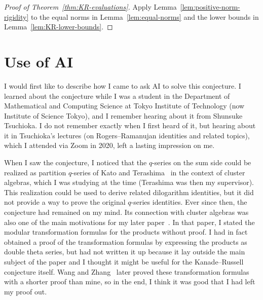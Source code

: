 \documentclass[11pt]{article}
\numberwithin{equation}{section}
\theoremstyle{remark}
\begin{document}
\begin{proof}[Proof of Theorem~\ref{thm:KR-evaluations}]
Apply Lemma~\ref{lem:positive-norm-rigidity} to the equal norms in
Lemma~\ref{lem:equal-norms} and the lower bounds in
Lemma~\ref{lem:KR-lower-bounds}.
\end{proof}

\section*{Use of AI}
\label{sec:ai-discovery}

I would first like to describe how I came to ask AI to solve this conjecture.
I learned about the conjecture while I was a student in the Department of Mathematical and Computing Science
at Tokyo Institute of Technology (now Institute of Science Tokyo), and I remember hearing about it from Shunsuke Tsuchioka.
I do not remember exactly when I first heard of it, but hearing about it in Tsuchioka's lectures
(on Rogers--Ramanujan identities and related topics), which I attended via Zoom in 2020, left a lasting impression on me.

When I saw the conjecture, I noticed that the $q$-series on the sum side could be realized as
partition $q$-series of Kato and Terashima~\cite{KatoTerashima2015} in the context of cluster algebras,
which I was studying at the time (Terashima was then my supervisor).
This realization could be used to derive related dilogarithm identities, but it did not provide a way to prove
the original $q$-series identities. Ever since then, the conjecture had remained on my mind.
Its connection with cluster algebras was also one of the main motivations for my later paper~\cite{Mizuno2025}.
In that paper, I stated the modular transformation formulas for the products without proof.
I had in fact obtained a proof of the transformation formulas by expressing the products as double theta series,
but had not written it up because it lay outside the main subject of the paper and I thought it might be useful
for the Kanade--Russell conjecture itself.
Wang and Zhang~\cite{WangZhang2025} later proved these transformation formulas with a shorter proof than mine,
so in the end, I think it was good that I had left my proof out.
\end{document}
